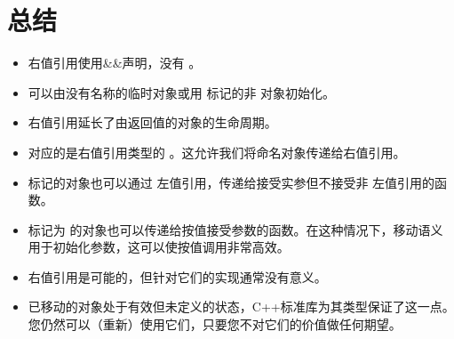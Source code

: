 \section{总结}
\begin{itemize}
	\item 右值引用使用\&\&声明，没有 。
	\item 可以由没有名称的临时对象或用  标记的非  对象初始化。
	\item 右值引用延长了由返回值的对象的生命周期。
	\item {} 对应的是右值引用类型的 。这允许我们将命名对象传递给右值引用。
	\item {} 标记的对象也可以通过  左值引用，传递给接受实参但不接受非  左值引用的函数。
	\item 标记为  的对象也可以传递给按值接受参数的函数。在这种情况下，移动语义用于初始化参数，这可以使按值调用非常高效。
	\item {} 右值引用是可能的，但针对它们的实现通常没有意义。
	\item 已移动的对象处于有效但未定义的状态，C++标准库为其类型保证了这一点。您仍然可以（重新）使用它们，只要您不对它们的价值做任何期望。
\end{itemize}


